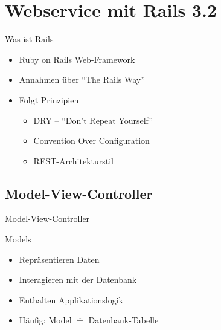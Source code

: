 
\lstset{
  language=Ruby,
  gobble=4,
  basicstyle=\ttfamily\small
}

\section[Webservice]{Webservice mit Rails 3.2}

\begin{frame}{Was ist Rails}
  \begin{itemize}
    \item Ruby on Rails Web-Framework
    \item Annahmen über \enquote{The Rails Way}
    \item Folgt Prinzipien
    \begin{itemize}
      \item DRY -- \enquote{Don’t Repeat Yourself}
      \item Convention Over Configuration
      \item REST-Architekturstil
    \end{itemize}
  \end{itemize}
\end{frame}

\subsection{Model-View-Controller}

\begin{frame}[fragile]{Model-View-Controller}
  \begin{center}
    
  \end{center}
\end{frame}

\begin{frame}{Models}
  \begin{itemize}
    \item Repräsentieren Daten
    \item Interagieren mit der Datenbank
    \item Enthalten Applikationslogik
    \item Häufig: Model $\hat =$ Datenbank-Tabelle
  \end{itemize}
\end{frame}

